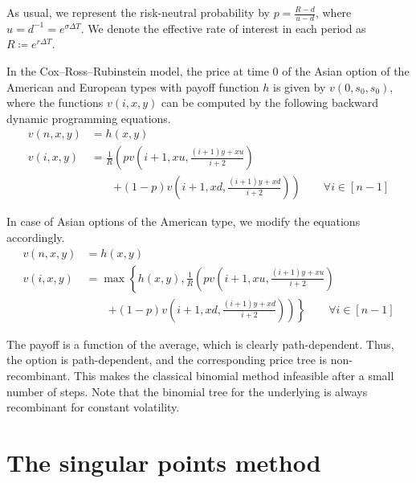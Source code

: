 As usual, we represent the risk-neutral probability by $ p = \frac{R - d}{u - d} $, where $ u = d^{-1} = e^{\sigma \Delta T} $. We denote the effective rate of interest in each period as $ R \coloneqq e^{r \Delta T} $.

In the Cox–Ross–Rubinstein model, the price at time 0 of the Asian option of the American and European types with payoff function $ h $ is given by $ v(0, s_0, s_0) $, where the functions $ v(i, x, y) $ can be computed by the following backward dynamic programming equations.
\begin{subequations}
	\label{eq:asian-dp-eu}
	\begin{align}
		v(n, x, y)  &=  h(x,y)  \\
		v(i, x, y)  &=  \frac{1}{R} \left(  p v \left( i + 1, x u, \frac{(i + 1) y + x u}{i + 2} \right)  \right.  \\
		&  \qquad  \left. + (1-p) v \left( i + 1, x d, \frac{(i + 1) y + x d}{i + 2} \right)  \right)  \qquad   \forall i \in [n - 1]  \nonumber
	\end{align}
\end{subequations}

In case of Asian options of the American type, we modify the equations accordingly.
\begin{subequations}
	\label{eq:asian-dp-am}
	\begin{align}
		v(n, x, y)  &=  h(x,y)  \\
		v(i, x, y)  &=  \max \left\lbrace  h(x, y), \frac{1}{R} \left(  p v \left( i + 1, x u, \frac{(i + 1) y + x u}{i + 2} \right)  \right. \right. \\
		&  \qquad  \left. \left. + (1-p) v \left( i + 1, x d, \frac{(i + 1) y + x d}{i + 2} \right)  \right)  \right\rbrace  \qquad  \forall i \in [n - 1]  \nonumber
	\end{align}
\end{subequations}

The payoff is a function of the average, which is clearly path-dependent. Thus, the option is path-dependent, and the corresponding price tree is non-recombinant. This makes the classical binomial method infeasible after a small number of steps. Note that the binomial tree for the underlying is always recombinant for constant volatility.


\section{The singular points method}
\label{sec:asian-method}

